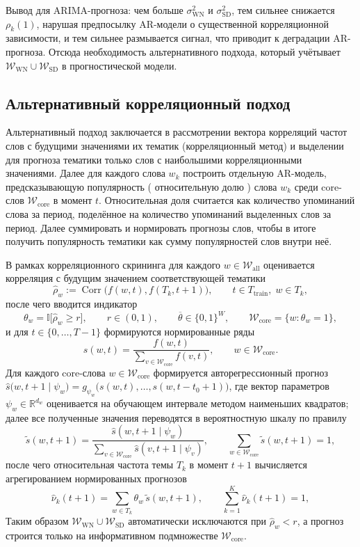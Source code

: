 \documentclass[14pt,a4paper]{article}
\begin{document}
Вывод для ARIMA-прогноза: чем больше $\sigma_{\mathrm{WN}}^{2}$ и $\sigma_{\mathrm{SD}}^{2}$, тем сильнее
снижается $\rho_{k}(1)$, нарушая предпосылку AR-модели о существенной
корреляционной зависимости, и тем сильнее размывается сигнал, что приводит к деградации AR-прогноза.
Отсюда необходимость альтернативного подхода, который учётывает $\mathcal{W}_{\mathrm{WN}}\cup\mathcal{W}_{\mathrm{SD}}$ в прогностической модели.



\newpage
\subsection{Альтернативный корреляционный подход}
\label{ssec:alt}

Альтернативный подход заключается в рассмотрении вектора корреляций частот слов с будущими значениями их тематик (корреляционный метод) и выделении для прогноза тематики только слов с наибольшими корреляционными значениями.
Далее для каждого слова $w_k$ построить отдельную AR-модель, предсказывающую популярность ( относительную долю ) слова $w_k$ среди core-слов $\mathcal{W}_{\mathrm{core}}$ в момент $t$.
Относительная доля считается как количество упоминаний слова за период, поделённое на количество упоминаний выделенных слов за период.
Далее суммировать и нормировать прогнозы слов, чтобы в итоге получить популярность тематики как сумму популярностей слов внутри неё.

В рамках корреляционного скрининга для каждого $w\in\mathcal{W}_{\mathrm{all}}$ оценивается корреляция с будущим значением соответствующей тематики 
\[
\widehat\rho_{w}:=\operatorname{Corr}\bigl(f(w,t),f(T_{k},t+1)\bigr),\qquad t\in T_{\mathrm{train}},\;w\in T_{k},
\]
после чего вводится индикатор 
\[
\theta_{w}=\mathbb{I}\bigl[\widehat\rho_{w}\ge r\bigr],\qquad r\in(0,1),\qquad\overline{\theta}\in\{0,1\}^{W},\qquad 
\mathcal{W}_{\mathrm{core}}=\{w:\theta_{w}=1\},
\]
и для $t\in\{0,\dots,T-1\}$ формируются нормированные ряды
\[
s(w,t)=\frac{f(w,t)}{\displaystyle\sum_{v\in\mathcal{W}_{\mathrm{core}}}f(v,t)},\qquad w\in\mathcal{W}_{\mathrm{core}}.
\]
Для каждого core-слова $w\in\mathcal{W}_{\mathrm{core}}$ формируется авторегрессионный прогноз $\widehat{s}\!\bigl(w,t+1\mid\psi_{w}\bigr)=g_{\psi_{w}}\bigl(s(w,t),\dots,s(w,t-t_{0}+1)\bigr)$, где вектор параметров $\psi_{w}\in\mathbb{R}^{d_{w}}$ оценивается на обучающем интервале методом наименьших квадратов; далее все полученные значения переводятся в вероятностную шкалу по правилу
\[
\widetilde{s}(w,t+1)=\frac{\widehat{s}(w,t+1\mid\psi_{w})}{\sum_{v\in\mathcal{W}_{\mathrm{core}}}\widehat{s}(v,t+1\mid\psi_{v})},\qquad \sum_{w\in\mathcal{W}_{\mathrm{core}}}\widetilde{s}(w,t+1)=1,
\]
после чего относительная частота темы $T_{k}$ в момент $t+1$ вычисляется агрегированием нормированных прогнозов
\[
\widehat{\nu}_{k}(t+1)=\sum_{w\in T_{k}}\theta_{w}\,\widetilde{s}(w,t+1),\qquad\sum_{k=1}^{K}\widehat{\nu}_{k}(t+1)=1,
\]
Таким образом $\mathcal{W}_{\mathrm{WN}}\cup\mathcal{W}_{\mathrm{SD}}$  
автоматически исключаются при $\widehat\rho_{w}<r$,  
а прогноз строится только на информативном подмножестве
$\mathcal{W}_{\mathrm{core}}$.
\end{document}
